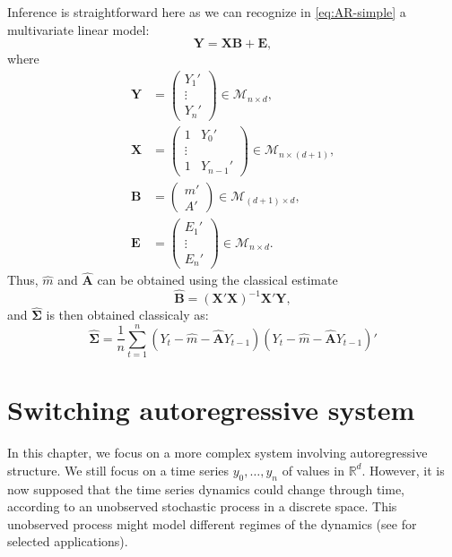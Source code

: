 \documentclass[]{book}
\begin{document}
Inference is straightforward here as we can recognize in \eqref{eq:AR-simple} a multivariate linear model:
\[\mathbf{Y} = \mathbf{XB} + \mathbf{E},\]
where
\begin{align*}
\mathbf{Y} &= 
\begin{pmatrix}
Y_1'\\
\vdots\\
Y_n'
\end{pmatrix} \in \mathcal{M}_{n \times d},\\
\mathbf{X} &= 
\begin{pmatrix}
1 & Y_0'\\
\vdots\\
1 & Y_{n-1}'
\end{pmatrix} \in \mathcal{M}_{n \times (d+1)},\\
\mathbf{B} &= 
\begin{pmatrix}
m'\\
A'
\end{pmatrix} \in \mathcal{M}_{(d + 1) \times d},\\
\mathbf{E} &= 
\begin{pmatrix}
E_1'\\
\vdots\\
E_n'
\end{pmatrix} \in \mathcal{M}_{n \times d}.
\end{align*}
Thus, \(\hat{m}\) and \(\hat{\mathbf{A}}\) can be obtained using the classical estimate
\begin{equation}
\hat{\mathbf{B}} = \left(\mathbf{X'X}\right)^{-1}\mathbf{X}'\mathbf{Y}, \label{eq:AR-simple-B-hat}
\end{equation}
and \(\hat{\mathbf{\Sigma}}\) is then obtained classicaly as:
\begin{equation}
\hat{\mathbf{\Sigma}} = \frac{1}{n} \sum_{t = 1}^n \left(Y_t - \hat{m} - \hat{\mathbf{A}} Y_{t - 1}\right) \left(Y_t - \hat{m} - \hat{\mathbf{A}} Y_{t - 1}\right)' \label{eq:AR-simple-Sigma-hat}
\end{equation}

\hypertarget{switching-autoregressive-system}{%
\chapter{Switching autoregressive system}\label{switching-autoregressive-system}}

In this chapter, we focus on a more complex system involving autoregressive structure. We still focus on a time series \(y_0, \dots, y_n\) of values in \(\mathbb{R}^d\). However, it is now supposed that the time series dynamics could change through time, according to an unobserved stochastic process in a discrete space.
This unobserved process might model different regimes of the dynamics (see \citet{rabiner1989tutorial} for selected applications).
\end{document}
